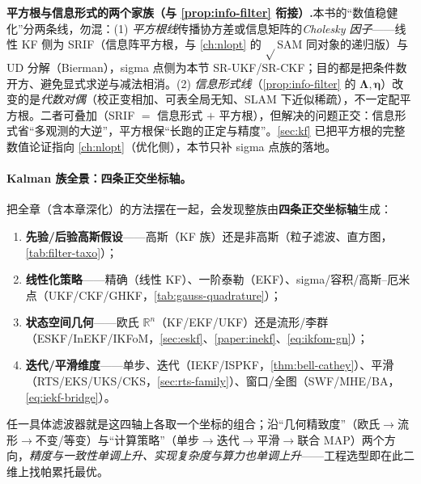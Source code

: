 \begin{note}
\textbf{平方根与信息形式的两个家族（与 \cref{prop:info-filter} 衔接）.}\;本书的“数值稳健化”分两条线，勿混：(1) \emph{平方根线}传播协方差或信息矩阵的\emph{Cholesky 因子}——线性 KF 侧为 SRIF（信息阵平方根，与 \cref{ch:nlopt} 的 $\sqrt{}$SAM 同对象的递归版）与 UD 分解（Bierman），sigma 点侧为本节 SR-UKF/SR-CKF；目的都是把条件数开方、避免显式求逆与减法相消。(2) \emph{信息形式线}（\cref{prop:info-filter} 的 $\boldsymbol{\Lambda},\boldsymbol{\eta}$）改变的是\emph{代数对偶}（校正变相加、可表全局无知、SLAM 下近似稀疏），不一定配平方根。二者可叠加（SRIF $=$ 信息形式 $+$ 平方根），但解决的问题正交：信息形式省“多观测的大逆”，平方根保“长跑的正定与精度”。\cref{sec:kf} 已把平方根的完整数值论证指向 \cref{ch:nlopt}（优化侧），本节只补 sigma 点族的落地。
\end{note}

\paragraph{Kalman 族全景：四条正交坐标轴。}
把全章（含本章深化）的方法摆在一起，会发现整族由\textbf{四条正交坐标轴}生成\cite{barfoot2024state}：
\begin{enumerate}
  \item \textbf{先验/后验高斯假设}——高斯（KF 族）还是非高斯（粒子滤波、直方图，\cref{tab:filter-taxo}）；
  \item \textbf{线性化策略}——精确（线性 KF）、一阶泰勒（EKF）、sigma/容积/高斯--厄米点（UKF/CKF/GHKF，\cref{tab:gauss-quadrature}）；
  \item \textbf{状态空间几何}——欧氏 $\mathbb{R}^n$（KF/EKF/UKF）还是流形/李群（ESKF/InEKF/IKFoM，\cref{sec:eskf}、\cref{paper:inekf}、\cref{eq:ikfom-gn}）；
  \item \textbf{迭代/平滑维度}——单步、迭代（IEKF/ISPKF，\cref{thm:bell-cathey}）、平滑（RTS/EKS/UKS/CKS，\cref{sec:rts-family}）、窗口/全图（SWF/MHE/BA，\cref{eq:iekf-bridge}）。
\end{enumerate}
任一具体滤波器就是这四轴上各取一个坐标的组合；沿“几何精致度”（欧氏$\to$流形$\to$不变/等变）与“计算策略”（单步$\to$迭代$\to$平滑$\to$联合 MAP）两个方向，\emph{精度与一致性单调上升、实现复杂度与算力也单调上升}——工程选型即在此二维上找帕累托最优。

